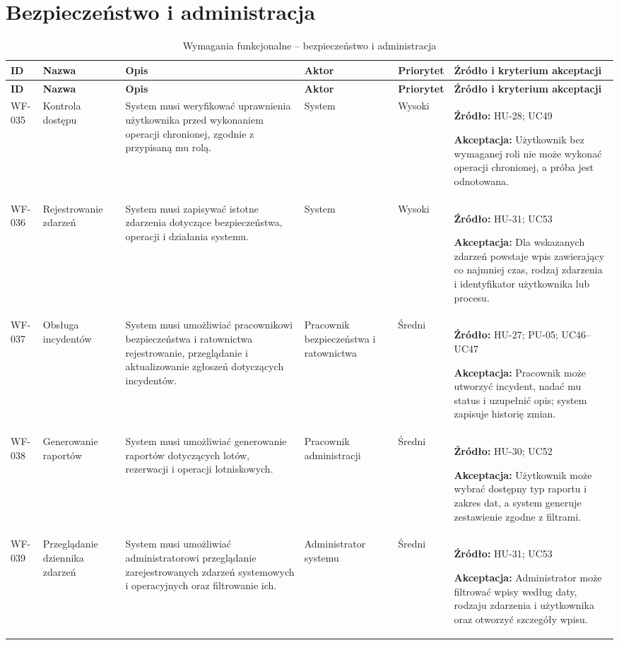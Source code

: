 \documentclass[12pt,a4paper,oneside]{report}
\begin{document}
\section{Bezpieczeństwo i administracja}
\small
\begin{longtable}{|p{1.05cm}|p{2.15cm}|p{3.35cm}|p{1.75cm}|p{0.95cm}|p{4.05cm}|}
\caption{Wymagania funkcjonalne -- bezpieczeństwo i administracja}\\\hline
\rowcolor{lightblue}\textbf{ID} & \textbf{Nazwa} & \textbf{Opis} & \textbf{Aktor} & \textbf{Priorytet} & \textbf{Źródło i kryterium akceptacji}\\\hline
\endfirsthead
\hline
\rowcolor{lightblue}\textbf{ID} & \textbf{Nazwa} & \textbf{Opis} & \textbf{Aktor} & \textbf{Priorytet} & \textbf{Źródło i kryterium akceptacji}\\\hline
\endhead
WF-035 & Kontrola dostępu & System musi weryfikować uprawnienia użytkownika przed wykonaniem operacji chronionej, zgodnie z przypisaną mu rolą. & System & Wysoki & \textbf{Źródło:} HU-28; UC49\par\textbf{Akceptacja:} Użytkownik bez wymaganej roli nie może wykonać operacji chronionej, a próba jest odnotowana.\\\hline
WF-036 & Rejestrowanie zdarzeń & System musi zapisywać istotne zdarzenia dotyczące bezpieczeństwa, operacji i działania systemu. & System & Wysoki & \textbf{Źródło:} HU-31; UC53\par\textbf{Akceptacja:} Dla wskazanych zdarzeń powstaje wpis zawierający co najmniej czas, rodzaj zdarzenia i identyfikator użytkownika lub procesu.\\\hline
WF-037 & Obsługa incydentów & System musi umożliwiać pracownikowi bezpieczeństwa i ratownictwa rejestrowanie, przeglądanie i aktualizowanie zgłoszeń dotyczących incydentów. & Pracownik bezpieczeństwa i ratownictwa & Średni & \textbf{Źródło:} HU-27; PU-05; UC46–UC47\par\textbf{Akceptacja:} Pracownik może utworzyć incydent, nadać mu status i uzupełnić opis; system zapisuje historię zmian.\\\hline
WF-038 & Generowanie raportów & System musi umożliwiać generowanie raportów dotyczących lotów, rezerwacji i operacji lotniskowych. & Pracownik administracji & Średni & \textbf{Źródło:} HU-30; UC52\par\textbf{Akceptacja:} Użytkownik może wybrać dostępny typ raportu i zakres dat, a system generuje zestawienie zgodne z filtrami.\\\hline
WF-039 & Przeglądanie dziennika zdarzeń & System musi umożliwiać administratorowi przeglądanie zarejestrowanych zdarzeń systemowych i operacyjnych oraz filtrowanie ich. & Administrator systemu & Średni & \textbf{Źródło:} HU-31; UC53\par\textbf{Akceptacja:} Administrator może filtrować wpisy według daty, rodzaju zdarzenia i użytkownika oraz otworzyć szczegóły wpisu.\\\hline

\end{longtable}
\end{document}
